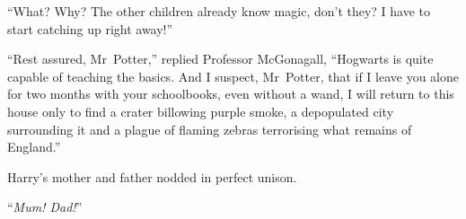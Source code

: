 “What?
Why?
The other children already know magic, don’t they?
I have to start catching up right away!”

“Rest assured, Mr~Potter,” replied Professor McGonagall, “Hogwarts is quite capable of teaching the basics.
And I suspect, Mr~Potter, that if I leave you alone for two months with your schoolbooks, even without a wand, I will return to this house only to find a crater billowing purple smoke, a depopulated city surrounding it and a plague of flaming zebras terrorising what remains of England.”

Harry’s mother and father nodded in perfect unison.

“\emph{Mum!
Dad!}”

